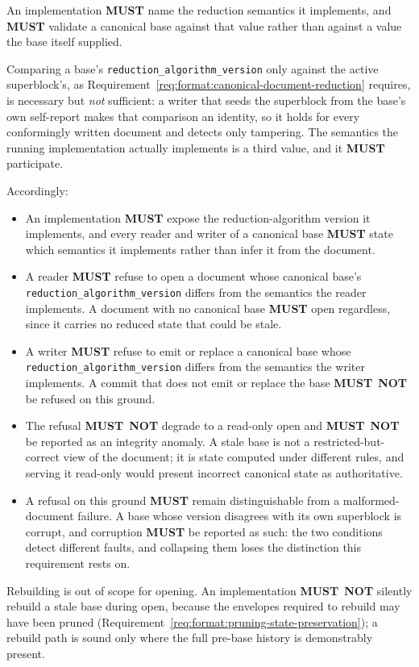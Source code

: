 \documentclass[11pt,letterpaper]{report}
\newcounter{requirement}[chapter]
\newcommand{\MUST}{\textbf{MUST}}
\newcommand{\MUSTNOT}{\textbf{MUST}\nobreak\ \textbf{NOT}}
\begin{document}
\begin{requirement}
  \label{req:format:reduction-authority}
  An implementation \MUST{} name the reduction semantics it
  implements, and \MUST{} validate a canonical base against that
  value rather than against a value the base itself supplied.

  Comparing a base's \texttt{reduction\_algorithm\_version} only
  against the active superblock's, as
  Requirement~\ref{req:format:canonical-document-reduction}
  requires, is necessary but \emph{not} sufficient: a writer that
  seeds the superblock from the base's own self-report makes that
  comparison an identity, so it holds for every conformingly
  written document and detects only tampering. The semantics the
  running implementation actually implements is a third value, and
  it \MUST{} participate.

  Accordingly:

  \begin{itemize}
    \item An implementation \MUST{} expose the reduction-algorithm
      version it implements, and every reader and writer of a
      canonical base \MUST{} state which semantics it implements
      rather than infer it from the document.
    \item A reader \MUST{} refuse to open a document whose
      canonical base's \texttt{reduction\_algorithm\_version}
      differs from the semantics the reader implements. A document
      with no canonical base \MUST{} open regardless, since it
      carries no reduced state that could be stale.
    \item A writer \MUST{} refuse to emit or replace a canonical
      base whose \texttt{reduction\_algorithm\_version} differs
      from the semantics the writer implements. A commit that does
      not emit or replace the base \MUSTNOT{} be refused on this
      ground.
    \item The refusal \MUSTNOT{} degrade to a read-only open and
      \MUSTNOT{} be reported as an integrity anomaly. A stale base
      is not a restricted-but-correct view of the document; it is
      state computed under different rules, and serving it
      read-only would present incorrect canonical state as
      authoritative.
    \item A refusal on this ground \MUST{} remain distinguishable
      from a malformed-document failure. A base whose version
      disagrees with its own superblock is corrupt, and corruption
      \MUST{} be reported as such: the two conditions detect
      different faults, and collapsing them loses the distinction
      this requirement rests on.
  \end{itemize}

  Rebuilding is out of scope for opening. An implementation
  \MUSTNOT{} silently rebuild a stale base during open, because
  the envelopes required to rebuild may have been pruned
  (Requirement~\ref{req:format:pruning-state-preservation}); a rebuild
  path is sound only
  where the full pre-base history is demonstrably present.
\end{requirement}
\end{document}
